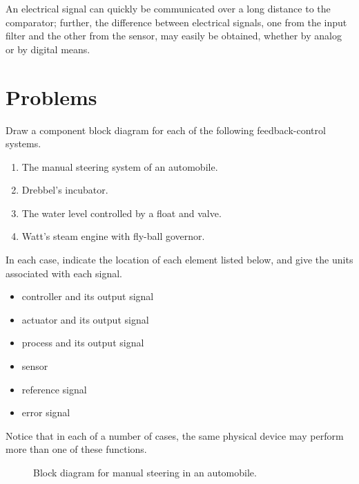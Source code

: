 \begin{solution}
   An electrical signal can quickly be communicated over a long distance to the
   comparator; further, the difference between electrical signals, one from the
   input filter and the other from the sensor, may easily be obtained, whether
   by analog or by digital means.
\end{solution}

\section{Problems}

\begin{problem}
   Draw a component block diagram for each of the following feedback-control
   systems.
   \begin{enumerate}
      \item The manual steering system of an automobile.
      \item Drebbel's incubator.
      \item The water level controlled by a float and valve.
      \item Watt's steam engine with fly-ball governor.
   \end{enumerate}
   In each case, indicate the location of each element listed below, and give
   the units associated with each signal.
   \begin{itemize}
      \item controller and its output signal
      \item actuator and its output signal
      \item process and its output signal
      \item sensor
      \item reference signal
      \item error signal
   \end{itemize}
   Notice that in each of a number of cases, the same physical device may
   perform more than one of these functions.
\end{problem}

\begin{figure}
   \begin{center}
      \begin{small}
         
      \end{small}
      \caption{Block diagram for manual steering in an automobile.}
      \label{fig:manual-steering}
   \end{center}
\end{figure}

